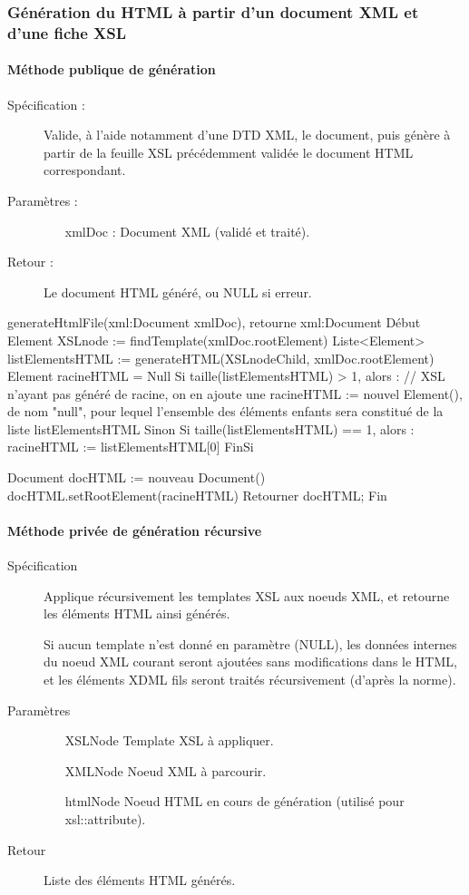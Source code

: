 \documentclass[10pt,a4paper]{article}
\begin{document}
\subsubsection{Génération du HTML à partir d’un document XML et d’une fiche XSL}
\paragraph{Méthode publique de génération}
\begin{description}
\item[Spécification :] Valide, à l’aide notamment d’une DTD XML, le document, puis génère à partir de la feuille XSL précédemment validée le document HTML correspondant.
\item[Paramètres :] 
\begin{itemize}
\item[xmlDoc] : Document XML (validé et traité).
\end{itemize}
\item[Retour :] Le document HTML généré, ou NULL si erreur.
\end{description}

\begin{verbatimtab}
generateHtmlFile(xml:Document xmlDoc), retourne xml:Document
Début
	Element XSLnode := findTemplate(xmlDoc.rootElement)
	Liste<Element> listElementsHTML := generateHTML(XSLnodeChild, xmlDoc.rootElement)
	Element racineHTML = Null
	Si taille(listElementsHTML) > 1, alors :
	// XSL n'ayant pas généré de racine, on en ajoute une
		racineHTML := nouvel Element(), de nom "null", pour lequel l'ensemble des éléments
			enfants sera constitué de la liste listElementsHTML
	Sinon Si taille(listElementsHTML) == 1, alors :
		racineHTML := listElementsHTML[0]
	FinSi
   
	Document docHTML := nouveau Document()
	docHTML.setRootElement(racineHTML)
	Retourner docHTML;
Fin
\end{verbatimtab}

\paragraph{Méthode privée de génération récursive}
\begin{description}
\item[Spécification] Applique récursivement les templates XSL aux noeuds XML, et retourne les éléments HTML ainsi générés.

Si aucun template n’est donné en paramètre (NULL), les données internes du noeud XML courant seront ajoutées sans modifications dans le HTML, et les éléments XDML fils seront traités récursivement (d’après la norme).
\item[Paramètres]
\begin{itemize}
\item[XSLNode] Template XSL à appliquer.
\item[XMLNode] Noeud XML à parcourir.
\item[htmlNode] Noeud HTML en cours de génération (utilisé pour xsl::attribute).
\end{itemize}
\item[Retour] Liste des éléments HTML générés.
\end{description}
\end{document}
